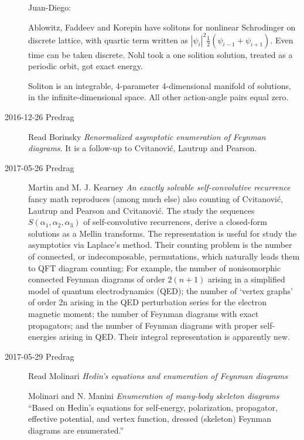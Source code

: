 \begin{description}
Juan-Diego:

Ablowitz, Faddeev and Korepin have solitons for nonlinear Schrodinger on discrete
lattice, with quartic term written as
$|\psi_i|^2\frac{1}{2}(\psi_{i-1}+\psi_{i+1})$. Even time can be taken
discrete. Nohl took a one solition solution, treated as a periodic
orbit, got exact energy.

Soliton is an integrable, 4-parameter 4-dimensional manifold of solutions, in the
infinite-dimensional space. All other action-angle pairs equal zero.

\item[2016-12-26 Predrag] Read
Borinsky
{\em Renormalized asymptotic enumeration of {Feynman} diagrams}.
It is a follow-up to Cvitanovi\'c, Lautrup and Pearson.

\item[2017-05-26 Predrag]
Martin and M. J. Kearney
{\em An exactly solvable self-convolutive recurrence} fancy math
reproduces (among much else) also counting of
Cvitanovi\'c, Lautrup and Pearson
and
Cvitanovi\'c.
The study the sequences $S(\alpha_1, \alpha_2, \alpha_3)$ of
self-convolutive recurrences, derive a closed-form solutions as a Mellin
transforms.
The representation is useful for study the asymptotics via Laplace's
method. Their counting problem is the number of connected, or
indecomposable, permutations, which naturally leads them to QFT diagram
counting; For example, the number of nonisomorphic connected Feynman
diagrams of order $2(n + 1)$ arising in a simplified model of quantum
electrodynamics (QED); the number of `vertex graphs' of
order 2n arising in the QED perturbation series for the electron magnetic
moment; the number of Feynman diagrams with exact
propagators; and the number of Feynman diagrams with proper
self-energies arising in QED.
Their integral representation is apparently new.

\item[2017-05-29 Predrag] Read
Molinari
{\em Hedin's equations and enumeration of {Feynman} diagrams}

Molinari and N. Manini
{\em Enumeration of many-body skeleton diagrams}
``Based on Hedin's equations for self-energy, polarization, propagator,
effective potential, and vertex function, dressed (skeleton) Feynman
diagrams are enumerated.''


\end{description}
